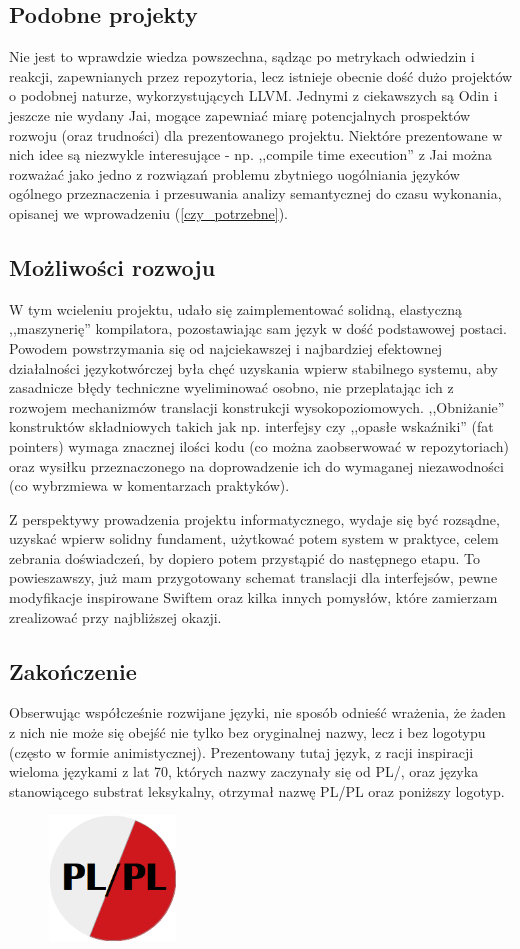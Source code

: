 \subsection{Podobne projekty}
Nie jest to wprawdzie wiedza powszechna, sądząc po metrykach odwiedzin i reakcji, zapewnianych przez repozytoria, lecz istnieje obecnie dość dużo projektów o podobnej naturze, wykorzystujących LLVM. Jednymi z ciekawszych są Odin\cite{Odin} i jeszcze nie wydany Jai\cite{Jai}, mogące zapewniać miarę potencjalnych prospektów rozwoju (oraz trudności) dla prezentowanego projektu. Niektóre prezentowane w nich idee są niezwykle interesujące - np. ,,compile time execution'' z Jai można rozważać jako jedno z rozwiązań problemu zbytniego uogólniania języków ogólnego przeznaczenia i przesuwania analizy semantycznej do czasu wykonania, opisanej we wprowadzeniu (\ref{czy_potrzebne}).

\subsection{Możliwości rozwoju}
W tym wcieleniu projektu, udało się zaimplementować solidną, elastyczną ,,maszynerię'' kompilatora, pozostawiając sam język w dość podstawowej postaci. Powodem powstrzymania się od najciekawszej i najbardziej efektownej działalności językotwórczej była chęć uzyskania wpierw stabilnego systemu, aby zasadnicze błędy techniczne wyeliminować osobno, nie przeplatając ich z rozwojem mechanizmów translacji konstrukcji wysokopoziomowych. ,,Obniżanie'' konstruktów składniowych takich jak np. interfejsy czy ,,opasłe wskaźniki'' (fat pointers) wymaga znacznej ilości kodu (co można zaobserwować w repozytoriach) oraz wysiłku przeznaczonego na doprowadzenie ich do wymaganej niezawodności (co wybrzmiewa w komentarzach praktyków).

Z perspektywy prowadzenia projektu informatycznego, wydaje się być rozsądne, uzyskać wpierw solidny fundament, użytkować potem system w praktyce, celem zebrania doświadczeń, by dopiero potem przystąpić do następnego etapu. To powieszawszy, już mam przygotowany schemat translacji dla interfejsów, pewne modyfikacje inspirowane Swiftem oraz kilka innych pomysłów, które zamierzam zrealizować przy najbliższej okazji.

\subsection{Zakończenie}
Obserwując współcześnie rozwijane języki, nie sposób odnieść wrażenia, że żaden z nich nie może się obejść nie tylko bez oryginalnej nazwy, lecz i bez logotypu (często w formie animistycznej). Prezentowany tutaj język, z racji inspiracji wieloma językami z lat 70, których nazwy zaczynały się od PL/, oraz języka stanowiącego substrat leksykalny, otrzymał nazwę PL/PL oraz poniższy logotyp.

\begin{figure}[h]
    \centering
    \includegraphics[width=0.3\textwidth]{images/znaczek.png}
\end{figure}